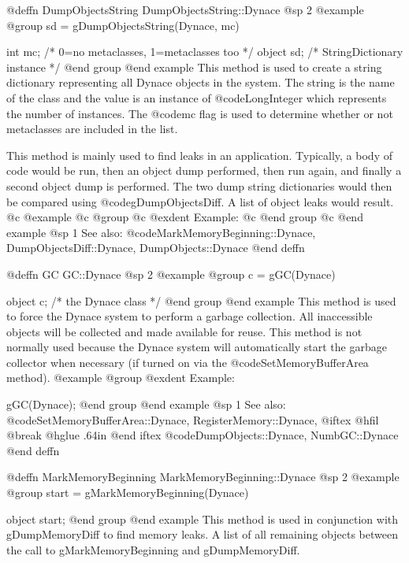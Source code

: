 @deffn {DumpObjectsString} DumpObjectsString::Dynace
@sp 2
@example
@group
sd = gDumpObjectsString(Dynace, mc)

int     mc;     /*  0=no metaclasses, 1=metaclasses too  */
object  sd;     /*  StringDictionary instance  */
@end group
@end example
This method is used to create a string dictionary representing all
Dynace objects in the system.  The string is the name of the class and
the value is an instance of @code{LongInteger} which represents the
number of instances.  The @code{mc} flag is used to determine whether or
not metaclasses are included in the list.

This method is mainly used to find leaks in an application.  Typically,
a body of code would be run, then an object dump performed, then run
again, and finally a second object dump is performed.  The two dump
string dictionaries would then be compared using
@code{gDumpObjectsDiff}.  A list of object leaks would result.
@c @example
@c @group
@c @exdent Example:
@c @end group
@c @end example
@sp 1
See also:  @code{MarkMemoryBeginning::Dynace, DumpObjectsDiff::Dynace, DumpObjects::Dynace}
@end deffn














@deffn {GC} GC::Dynace
@sp 2
@example
@group
c = gGC(Dynace)

object  c;    /*  the Dynace class  */
@end group
@end example
This method is used to force the Dynace system to perform a garbage collection.
All inaccessible objects will be collected and made available for reuse.
This method is not normally used because the Dynace system will automatically
start the garbage collector when necessary (if turned on via the
@code{SetMemoryBufferArea} method).
@example
@group
@exdent Example:

gGC(Dynace);
@end group
@end example
@sp 1
See also:  @code{SetMemoryBufferArea::Dynace, RegisterMemory::Dynace,}
@iftex
@hfil @break @hglue .64in    
@end iftex
@code{DumpObjects::Dynace, NumbGC::Dynace}
@end deffn







@deffn {MarkMemoryBeginning} MarkMemoryBeginning::Dynace
@sp 2
@example
@group
start = gMarkMemoryBeginning(Dynace)

object start;
@end group
@end example
This method is used in conjunction with gDumpMemoryDiff to find
memory leaks.  A list of all remaining objects between the call
to gMarkMemoryBeginning and gDumpMemoryDiff.


